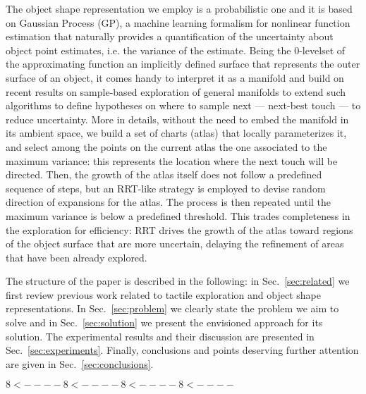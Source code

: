 The object shape representation we employ is a probabilistic one and it is based on Gaussian Process (GP), a machine learning formalism for nonlinear function estimation that naturally provides a quantification of the uncertainty about object point estimates, i.e. the variance of the estimate. Being the $0$-levelset of the approximating function an implicitly defined surface that represents the outer surface of an object, it comes handy to interpret it as a manifold and build on recent results on sample-based exploration of general manifolds to extend such algorithms to define hypotheses on where to sample next --- next-best touch --- to reduce uncertainty. More in details, without the need to embed the manifold in its ambient space, we build a set of charts (atlas) that locally parameterizes it, and select among the points on the current atlas the one associated to the maximum variance: this represents the location where the next touch will be directed. Then, the growth of the atlas itself does not follow a predefined sequence of steps, but an RRT-like strategy is employed to devise random direction of expansions for the atlas. The process is then repeated until the maximum variance is below a predefined threshold. This trades completeness in the exploration for efficiency: RRT drives the growth of the atlas toward  regions of the object surface that are more uncertain, delaying the refinement of areas that have been already explored.

The structure of the paper is described in the following: in Sec.~\ref{sec:related} we first review previous work related to tactile exploration and object shape representations. In Sec.~\ref{sec:problem} we clearly state the problem we aim to solve and in Sec.~\ref{sec:solution} we present the envisioned approach for its solution. The experimental results and their discussion are presented in Sec.~\ref{sec:experiments}. Finally, conclusions and points deserving further attention are given in Sec.~\ref{sec:conclusions}.

$ 8< ---- 8< ---- 8< ---- 8< ---- $







